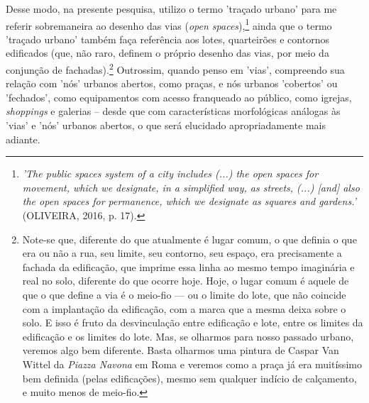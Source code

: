\documentclass[]{report}
\begin{document}
Desse modo, na presente pesquisa, utilizo o termo 'traçado urbano' para me referir sobremaneira ao desenho das vias (\textit{open spaces}),\footnote[3]{\textit{'The public spaces system of a city includes (...) the open spaces for movement, which we designate, in a simplified way, as streets, (...) [and] also the open spaces for permanence, which we designate as squares and gardens.'} (OLIVEIRA, 2016, p. 17).} ainda que o termo 'traçado urbano' também faça referência aos lotes, quarteirões e contornos edificados (que, não raro, definem o próprio desenho das vias, por meio da conjunção de fachadas).\footnote[4]{Note-se que, diferente do que atualmente é lugar comum, o que definia o que era ou não a rua, seu limite, seu contorno, seu espaço, era precisamente a fachada da edificação, que imprime essa linha ao mesmo tempo imaginária e real no solo, diferente do que ocorre hoje. Hoje, o lugar comum é aquele de que o que define a via é o meio-fio — ou o limite do lote, que não coincide com a implantação da edificação, com a marca que a mesma deixa sobre o solo. E isso é fruto da desvinculação entre edificação e lote, entre os limites da edificação e os limites do lote. Mas, se olharmos para nosso passado urbano, veremos algo bem diferente. Basta olharmos uma pintura de Caspar Van Wittel da \textit{Piazza Navona} em Roma e veremos como a praça já era muitíssimo bem definida (pelas edificações), mesmo sem qualquer indício de calçamento, e muito menos de meio-fio.} Outrossim, quando penso em 'vias', compreendo sua relação com 'nós' urbanos abertos, como praças, e nós urbanos 'cobertos' ou 'fechados', como equipamentos com acesso franqueado ao público, como igrejas, \textit{shoppings} e galerias – desde que com características morfológicas análogas às 'vias' e 'nós' urbanos abertos, o que será elucidado apropriadamente mais adiante.
\end{document}
